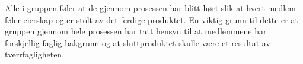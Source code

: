 Alle i gruppen føler at de gjennom prosessen har blitt hørt slik at hvert medlem føler eierskap og er stolt av det ferdige produktet. 
En viktig grunn til dette er at gruppen gjennom hele prosessen har tatt hensyn til at medlemmene har forskjellig faglig bakgrunn og 
at sluttproduktet skulle være et resultat av tverrfagligheten.


